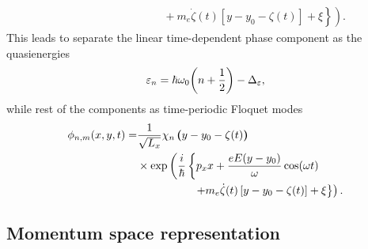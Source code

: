 \documentclass[
 reprint,
 amsmath,amssymb,
 aps,
 prb,
]{revtex4-2}
\begin{document}
\begin{appendix}
\begin{equation}
\begin{aligned}
    & \left. \left. \qquad\qquad\qquad\qquad
    + m_e\dot{\zeta}(t) \left[ y-y_0 -\zeta(t) \right]
    + \xi \right\}
     \right).
  \end{aligned}
\end{equation}
This leads to separate the linear time-dependent phase component as the quasienergies
\begin{equation} \label{eq:b6}
  \varepsilon_{n} =
  \hbar \omega_0\qty(n + \frac{1}{2}) - \Delta_{\varepsilon},
\end{equation}
while rest of the components as time-periodic Floquet modes
\begin{equation} \label{eq:b7}
  \begin{aligned}
    \phi_{n,m}(x,y,t) =  &
    \frac{1}{\sqrt{L_x}} \chi_n\bm{\left(}y - y_0 - \zeta(t)\bm{\right)} \\
    & \times
    \exp \left(
       \frac{i}{\hbar}
       \left\{
       p_x x +
       \frac{eE(y-y_0)}{\omega}\cos(\omega t)  \right. \right. \\
    & \left. \left. \qquad\qquad\quad
    + m_e\dot{\zeta}(t) \left[ y-y_0 -\zeta(t) \right]
    + \xi \right\}
     \right).
  \end{aligned}
\end{equation}

\subsection{Momentum space representation}


\end{appendix}
\end{document}
